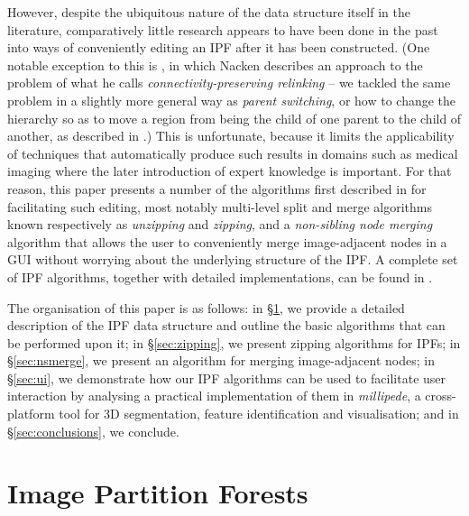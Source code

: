 \documentclass[a4paper]{article}
\begin{document}

However, despite the ubiquitous nature of the data structure itself in the literature, comparatively little research appears to have been done in the past into ways of conveniently editing an IPF after it has been constructed. (One notable exception to this is \cite{nacken95}, in which Nacken describes an approach to the problem of what he calls \emph{connectivity-preserving relinking} -- we tackled the same problem in a slightly more general way as \emph{parent switching}, or how to change the hierarchy so as to move a region from being the child of one parent to the child of another, as described in \cite{golodetz11}.) This is unfortunate, because it limits the applicability of techniques that automatically produce such results in domains such as medical imaging where the later introduction of expert knowledge is important. For that reason, this paper presents a number of the algorithms first described in \cite{golodetz11} for facilitating such editing, most notably multi-level split and merge algorithms known respectively as \emph{unzipping} and \emph{zipping}, and a \emph{non-sibling node merging} algorithm that allows the user to conveniently merge image-adjacent nodes in a GUI without worrying about the underlying structure of the IPF. A complete set of IPF algorithms, together with detailed implementations, can be found in \cite{golodetz11}.

The organisation of this paper is as follows: in \S\ref{sec:ipfs}, we provide a detailed description of the IPF data structure and outline the basic algorithms that can be performed upon it; in \S\ref{sec:zipping}, we present zipping algorithms for IPFs; in \S\ref{sec:nsmerge}, we present an algorithm for merging image-adjacent nodes; in \S\ref{sec:ui}, we demonstrate how our IPF algorithms can be used to facilitate user interaction by analysing a practical implementation of them in \emph{millipede}, a cross-platform tool for 3D segmentation, feature identification and visualisation; and in \S\ref{sec:conclusions}, we conclude.

\section{Image Partition Forests}
\label{sec:ipfs}
\end{document}
